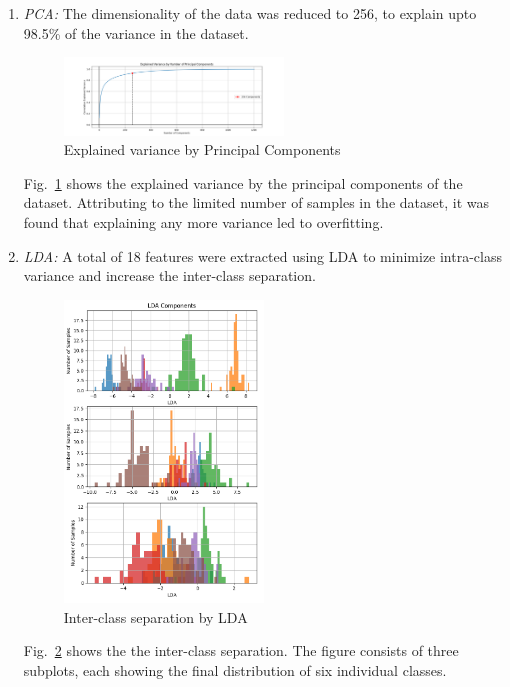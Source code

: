 \documentclass[conference]{IEEEtran}
\begin{document}
    \begin{enumerate}
        \item \textit{PCA:}
        The dimensionality of the data was reduced to 256, to explain upto 98.5\% of the variance in the dataset.

        \begin{figure}[htbp]
            \centerline{\includegraphics[width=0.55\textwidth]{Assets/pca.png}}
            \caption{Explained variance by Principal Components}
            \label{fig:pca}
        \end{figure}

        Fig.~\ref{fig:pca} shows the explained variance by the principal components of the dataset.
        Attributing to the limited number of samples in the dataset, it was found that explaining any more variance led to overfitting.

        \item \textit{LDA:}
        A total of 18 features were extracted using LDA to minimize intra-class variance and increase the inter-class separation.

        \begin{figure}[htbp]
            \centerline{\includegraphics[width=0.50\textwidth]{Assets/lda.png}}
            \caption{Inter-class separation by LDA}
            \label{fig:lda}
        \end{figure}

        Fig.~\ref{fig:lda} shows the the inter-class separation.
        The figure consists of three subplots, each showing the final distribution of six individual classes.
    \end{enumerate}
\end{document}
